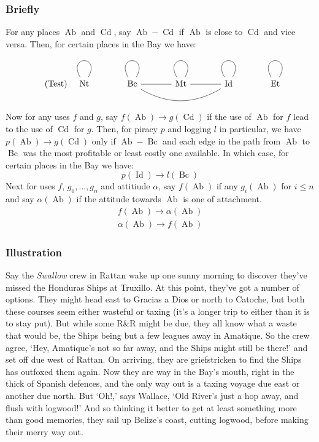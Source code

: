 \documentclass{amsart}
\newcommand{\titleit}[1]{\textit{#1}}%
\DeclareMathOperator{\id}{Id}%
\DeclareMathOperator{\mt}{Mt}%
\DeclareMathOperator{\bc}{Bc}%
\DeclareMathOperator{\et}{Et}%
\DeclareMathOperator{\nt}{Nt}%
\DeclareMathOperator{\ab}{Ab}%
\DeclareMathOperator{\cd}{Cd}%
\theoremstyle{definition}%
\theoremstyle{definition}%
\theoremstyle{remark}%
\theoremstyle{definition}%
\theoremstyle{definition}%
\begin{document}
\subsubsection{Briefly}
\label{sss:briefly}
For any places \(\ab\) and \(\cd\), say \(\ab-\cd\) if \(\ab\) is close to \(\cd\) and vice versa. Then, for certain places in the Bay we have:
%
\begin{equation}
\tag{Test}
\label{}
\begin{tikzcd}[arrows=dash,sep=large]
\nt \rar[out=120,in=60,loop] &\bc \rar \rar[out=120,in=60,loop] \ar[rr,bend right] &\mt \rar \rar[out=120,in=60,loop] &\id \rar[out=120,in=60,loop] &\et \rar[out=120,in=60,loop]
\end{tikzcd}
\end{equation}
%
Now for any uses \(f\) and \(g\), say \(f(\ab)\to g(\cd)\) if the use of \(\ab\) for \(f\) lead to the use of \(\cd\) for \(g\). Then, for piracy \(p\) and logging \(l\) in particular, we have \(p(\ab)\to g(\cd)\) only if \(\ab-\bc\) and each edge in the path from \(\ab\) to \(\bc\) was the most profitable or least costly one available. In which case, for certain places in the Bay we have:
%
\begin{equation}
\label{}
p(\id)\to l(\bc)
\end{equation}
%
Next for uses \(f\), \(g_{0},\ldots,g_{n}\) and attitiude \(\alpha\), say \(f(\ab)\) if any \(g_{i}(\ab)\) for \(i\leq n\) and say \(\alpha(\ab)\) if the attitude towards \(\ab\) is one of attachment.%
%
\begin{gather}
f(\ab)\to\alpha(\ab)\\
\alpha(\ab)\to f(\ab)
\end{gather}
%
\subsubsection{Illustration}%
\label{sss:illustration}
Say the \titleit{Swallow} crew in Rattan wake up one sunny morning to discover they've missed the Honduras Ships at Truxillo. At this point, they've got a number of options. They might head east to Gracias a Dios or north to Catoche, but both these courses seem either wasteful or taxing (it's a longer trip to either than it is to stay put). But while some R\&R might be due, they all know what a waste that would be, the Ships being but a few leagues away in Amatique. So the crew agree, `Hey, Amatique's not so far away, and the Ships might still be there!' and set off due west of Rattan. On arriving, they are griefstricken to find the Ships has outfoxed them again. Now they are way in the Bay's mouth, right in the thick of Spanish defences, and the only way out is a taxing voyage due east or another due north. But `Oh!,' says Wallace, `Old River's just a hop away, and flush with logwood!' And so thinking it better to get at least something more than good memories, they sail up Belize's coast, cutting logwood, before making their merry way out.
\end{document}
